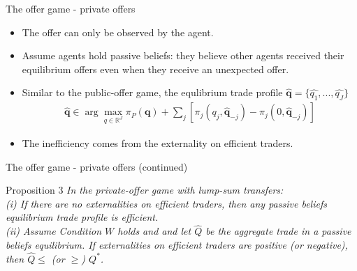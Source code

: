 \documentclass[aspectratio=169]{beamer}  %
\begin{document}
\begin{frame}{The offer game - private offers}
    \begin{itemize}
        \item The offer can only be observed by the agent. \vspace{.2cm}
        \item Assume agents hold passive beliefs: they believe other agents received their equilibrium offers even when they receive an unexpected offer. \vspace{.2cm}
        \item Similar to the public-offer game, the equlibrium trade profile $\hat{\mathbf{q}}=\{\hat{q_1},...,\hat{q_J}\}$ 
        \begin{align*}
            \hat{\mathbf{q}} \in \arg \max_{q \in \mathbb{R}^J} \pi_P(\mathbf{q}) + \sum_j [ \pi_j(q_j, \hat{\mathbf{q}}_{-j}) - \pi_j(0, \hat{\mathbf{q}}_{-j})]
        \end{align*}
        \item The inefficiency comes from the externality on efficient traders.
    \end{itemize}
\end{frame}



\begin{frame}{The offer game - private offers (continued)}
    \begin{block}{Proposition 3}
        \textit{In the private-offer game with lump-sum transfers:\\
        (i) If there are no externalities on efficient traders, then any passive beliefs equilibrium trade profile is efficient.}\\
        \textit{(ii) Assume Condition $W$ holds and and let $\hat{Q}$ be the aggregate trade in a passive beliefs equilibrium. If externalities on efficient traders are positive (or negative), then $\hat{Q} \leq$ (or $\geq$) $Q^*$.}
    \end{block}
\end{frame}
\end{document}
